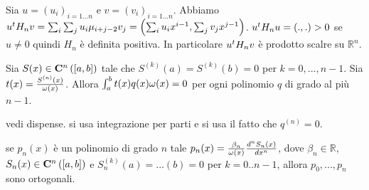\begin{Theorem}
	Sia $u = (u_i)_{i = 1...n}$ e $v = (v_i)_{i = 1...n}$. Abbiamo ${u}^tH_nv = \sum_i\sum_j u_i\mu_{i + j - 2}v_j = \left ( \sum_i u_i x^{i - 1} , \sum_j v_j x^{j - 1} \right )$.
	${u}^tH_n u = \left ( . , . \right ) > 0$ se $u \neq 0$ quindi $H_n$ \`e definita positiva.
	In particolare ${u}^tH_nv$ \`e prodotto scalre su $\mathbb{R}^n$.
\end{Theorem}
\begin{Theorem}
	Sia $S(x) \in \CClass{n}[[a,b]]$ tale che $S^{(k)}(a) = S^{(k)}(b) = 0$ per $k = 0, ..., n - 1$. Sia $t(x) = \frac{S^{(n)}(x)}{\omega(x)}$. Allora $\int_a^b t(x)q(x)\omega(x) = 0$ per ogni polinomio $q$ di grado al pi\`u $n - 1$.
\end{Theorem}
\Proof vedi dispense. si usa integrazione per parti e si usa il fatto che $q^{(n)} = 0$.
\begin{Theorem}
	 se $p_n(x)$ \`e un polinomio di grado $n$ tale $p_n(x) = \frac{\beta_n}{\omega(x)} \frac{d^n S_n(x)}{dx^n}$, dove $\beta_n \in \mathbb{R}$, $S_n(x) \in \CClass{n}[[a,b]]$ e $S_n^{(k)}(a) = ... (b) = 0$ per $k=0..n-1$, allora $p_0,...,p_n$ sono ortogonali.
\end{Theorem}
